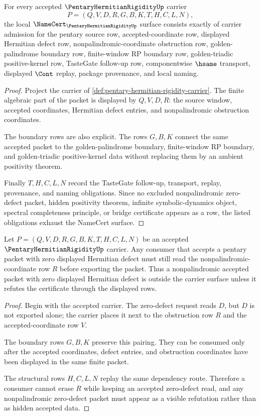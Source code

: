\begin{theorem}
\label{thm:pentary-hermitian-rigidity-obligation-surface}
For every accepted $\PentaryHermitianRigidityUp$ carrier
$$
P=(Q,V,D,R,G,B,K,T,H,C,L,N),
$$
the local $\NameCert_{\PentaryHermitianRigidityUp}$ surface consists exactly of carrier admission for the pentary source row, accepted-coordinate row, displayed Hermitian defect row, nonpalindromic-coordinate obstruction row, golden-palindrome boundary row, finite-window RP boundary row, golden-triadic positive-kernel row, TasteGate follow-up row, componentwise $\hsame$ transport, displayed $\Cont$ replay, package provenance, and local naming.
\end{theorem}
\begin{proof}
Project the carrier of \autoref{def:pentary-hermitian-rigidity-carrier}. The finite algebraic part of the packet is displayed by $Q,V,D,R$: the source window, accepted coordinates, Hermitian defect entries, and nonpalindromic obstruction coordinates.

The boundary rows are also explicit. The rows $G,B,K$ connect the same accepted packet to the golden-palindrome boundary, finite-window RP boundary, and golden-triadic positive-kernel data without replacing them by an ambient positivity theorem.

Finally $T,H,C,L,N$ record the TasteGate follow-up, transport, replay, provenance, and naming obligations. Since no excluded nonpalindromic zero-defect packet, hidden positivity theorem, infinite symbolic-dynamics object, spectral completeness principle, or bridge certificate appears as a row, the listed obligations exhaust the NameCert surface.
\end{proof}

\begin{theorem}
\label{thm:pentary-hermitian-rigidity-obstruction-nonescape}
Let $P=(Q,V,D,R,G,B,K,T,H,C,L,N)$ be an accepted $\PentaryHermitianRigidityUp$ carrier. Any consumer that accepts a pentary packet with zero displayed Hermitian defect must still read the nonpalindromic-coordinate row $R$ before exporting the packet. Thus a nonpalindromic accepted packet with zero displayed Hermitian defect is outside the carrier surface unless it refutes the certificate through the displayed rows.
\end{theorem}
\begin{proof}
Begin with the accepted carrier. The zero-defect request reads $D$, but $D$ is not exported alone; the carrier places it next to the obstruction row $R$ and the accepted-coordinate row $V$.

The boundary rows $G,B,K$ preserve this pairing. They can be consumed only after the accepted coordinates, defect entries, and obstruction coordinates have been displayed in the same finite packet.

The structural rows $H,C,L,N$ replay the same dependency route. Therefore a consumer cannot erase $R$ while keeping an accepted zero-defect read, and any nonpalindromic zero-defect packet must appear as a visible refutation rather than as hidden accepted data.
\end{proof}

